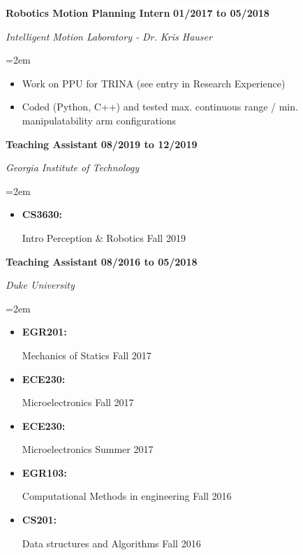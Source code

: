 \documentclass[paper=letter,fontsize=11pt]{scrartcl} %
\newcommand{\sepspace}{\vspace*{0em}}		%
\newcommand{\EducationEntry}[4]{
		\noindent \textbf{#1} \hfill      %
		\colorbox{White}{%
			\bf 
			\parbox{10em}{%
			\hfill\color{Black}#2}} \par  %
		\noindent \textit{#3} \par        %
		\noindent\hangindent=2em\hangafter=0 \small #4 %
		\normalsize \par}
\newcommand{\WorkEntry}[4]{				  %
		\noindent \textbf{#1} \hfill      %
		\colorbox{White}{\bf \color{Black}#2} \par  %
		\noindent \textit{#3} \par              %
		\noindent\hangindent=2em\hangafter=0 \small #4 %
		\normalsize \par}
\begin{document}
\WorkEntry{Robotics Motion Planning Intern}{01/2017 to 05/2018}{Intelligent Motion Laboratory - Dr. Kris Hauser}{
	\begin{itemize}
	\item Work on PPU for TRINA (see entry in Research Experience)
	\item Coded (Python, C++) and tested max. continuous range / min. manipulatability arm configurations
	\end{itemize}
}

\sepspace
\WorkEntry{Teaching Assistant}{08/2019 to 12/2019}{Georgia Institute of Technology}
{
	\begin{itemize}
		\item \parbox[t]{4.5em}{\bf CS3630:} Intro Perception \& Robotics \hfill Fall 2019
	\end{itemize}
}

\sepspace
\WorkEntry{Teaching Assistant}{08/2016 to 05/2018}{Duke University}
{
	\begin{itemize}
		\item \parbox[t]{4.5em}{\bf EGR201:} Mechanics of Statics \hfill Fall 2017
		\item \parbox[t]{4.5em}{\bf ECE230:} Microelectronics	\hfill Fall 2017
		\item \parbox[t]{4.5em}{\bf ECE230:} Microelectronics	\hfill Summer 2017
		\item \parbox[t]{4.5em}{\bf EGR103:} Computational Methods in engineering 	\hfill Fall 2016
		\item \parbox[t]{4.5em}{\bf CS201: } Data structures and Algorithms 	\hfill Fall 2016
	\end{itemize}
}
\end{document}
